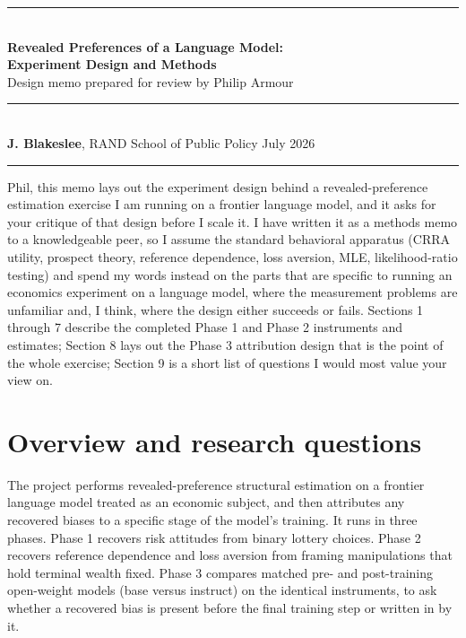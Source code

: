 \documentclass[11pt]{article}
\begin{document}
\begin{flushleft}
{\color{rulegray}\rule{\linewidth}{1.2pt}}\\[9pt]
{\LARGE\bfseries\color{ink} Revealed Preferences of a Language Model:}\\[3pt]
{\LARGE\bfseries\color{ink} Experiment Design and Methods}\\[8pt]
{\large\color{mossdk} Design memo prepared for review by Philip Armour}\\[10pt]
{\color{rulegray}\rule{\linewidth}{0.8pt}}\\[6pt]
{\small\color{ink}\textbf{J. Blakeslee}, RAND School of Public Policy \hfill July 2026}\\[3pt]
{\color{rulegray}\rule{\linewidth}{1.2pt}}
\end{flushleft}

\vspace{4pt}

Phil, this memo lays out the experiment design behind a revealed-preference estimation exercise
I am running on a frontier language model, and it asks for your critique of that design before I
scale it. I have written it as a methods memo to a knowledgeable peer, so I assume the standard
behavioral apparatus (CRRA utility, prospect theory, reference dependence, loss aversion, MLE,
likelihood-ratio testing) and spend my words instead on the parts that are specific to running an
economics experiment on a language model, where the measurement problems are unfamiliar and, I
think, where the design either succeeds or fails. Sections 1 through 7 describe the completed
Phase 1 and Phase 2 instruments and estimates; Section 8 lays out the Phase 3 attribution design
that is the point of the whole exercise; Section 9 is a short list of questions I would most value
your view on.

\section{Overview and research questions}

The project performs revealed-preference structural estimation on a frontier language model
treated as an economic subject, and then attributes any recovered biases to a specific stage of
the model's training. It runs in three phases. Phase 1 recovers risk attitudes from binary lottery
choices. Phase 2 recovers reference dependence and loss aversion from framing manipulations that
hold terminal wealth fixed. Phase 3 compares matched pre- and post-training open-weight models
(base versus instruct) on the identical instruments, to ask whether a recovered bias is present
before the final training step or written in by it.
\end{document}
